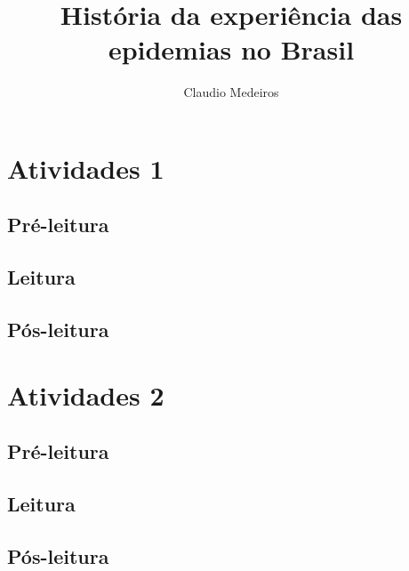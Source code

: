 \documentclass{article}
\begin{document}
\newcommand{\AutorLivro}{Claudio Medeiros}
\newcommand{\TituloLivro}{História da experiência das epidemias no Brasil}
\newcommand{\Tema}{Diálogos com a sociologia e com a antropologia}
\newcommand{\Genero}{Narrativa histórica}
\newcommand{\issnppub}{---}
\newcommand{\issnepub}{---}
\newcommand{\colaborador}{\textbf{Fulano de Tal} é uma pessoa incrível e vai fazer um bom serviço.}


\title{\TituloLivro}
\author{\AutorLivro}
\def\authornotes{\colaborador}

\date{}
\maketitle
\tableofcontents




\section{Atividades 1}


\subsection{Pré-leitura}
\subsection{Leitura}
\subsection{Pós-leitura}



\section{Atividades 2}

\subsection{Pré-leitura}
\subsection{Leitura}
\subsection{Pós-leitura}

\lipsum
\end{document}

